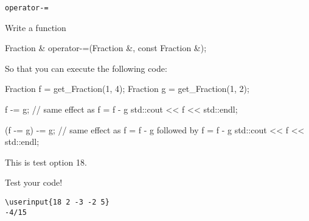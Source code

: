 \verb!operator-=!

Write a function
\begin{console}[commandchars=\\\{\}]
Fraction & operator-=(Fraction &, const Fraction &);
\end{console}

So that you can execute the following code:
\begin{console}
Fraction f = get_Fraction(1, 4);
Fraction g = get_Fraction(1, 2);

f -= g; // same effect as f = f - g
std::cout << f << std::endl;

(f -= g) -= g; // same effect as f = f - g followed by f = f - g
std::cout << f << std::endl;
\end{console}
This is test option 18.

Test your code!

\resett
\nextt
\begin{Verbatim}[frame=single, commandchars=\\\{\}]
\userinput{18 2 -3 -2 5}
-4/15
\end{Verbatim}
